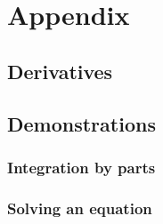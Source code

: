 \documentclass{report}
\begin{document}
\appendix
\part{Appendix}
\chapter{Derivatives}
\label{Titan:the_derivatives}

\chapter{Demonstrations}
\section{Integration by parts}
\label{math:int_by_part}
\section{Solving an equation}
\label{math:solving}

\clearpage


\end{document}
